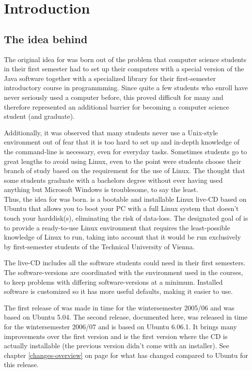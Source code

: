 
\chapter{Introduction}
\section{The idea behind \tunix}
The original idea for \tunix was born out of the problem that computer science
students in their first semester had to set up their computers with a special
version of the Java software together with a specialized library for their
first-semester introductory course in programmming. Since quite a few students
who enroll have never seriously used a computer before, this proved difficult
for many and therefore represented an additional barrier for becoming a computer
science student (and graduate).

Additionally, it was observed that many students never use a Unix-style
environment out of fear that it is too hard to set up and in-depth knowledge of
the command-line is necessary, even for everyday tasks. Sometimes students go to
great lengths to avoid using Linux, even to the point were students choose their
branch of study based on the requirement for the use of Linux. The thought that
some students graduate with a bachelors degree without ever having used anything
but Microsoft Windows is troublesome, to say the least.\\

Thus, the idea for \tunix was born. \tunix is a bootable and installable Linux
live-CD based on Ubuntu that allows you to boot your PC with a full Linux system
that doesn't touch your harddisk(s), eliminating the risk of data-loss. The
designated goal of \tunix is to provide a ready-to-use Linux environment that
requires the least-possible knowledge of Linux to run, taking into account that
it would be run exclusively by first-semester students of the Technical
University of Vienna.

The \tunix live-CD includes all the software students could need in their first
semesters. The software-versions are coordinated with the environment used in the
courses, to keep problems with differing software-versions at a minimum.
Installed software is customized so it has more useful defaults, making it
easier to use.

The first release of \tunix was made in time for the wintersemester 2005/06 and
was based on Ubuntu 5.04. The second release, documented here, was released in
time for the wintersemester 2006/07 and is based on Ubuntu 6.06.1. It brings
many improvements over the first version and is the first version where the
\tunix CD is actually installable (the previous version didn't come with an
installer). See chapter \ref{changes-overview} on page \pageref{changes-overview}
for what has changed compared to Ubuntu for this release.

